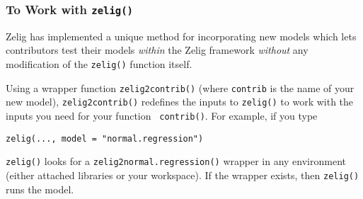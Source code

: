 \subsubsection{To Work with {\tt zelig()}}

Zelig has implemented a unique method for incorporating new models
which lets contributors test their models \emph{within} the Zelig
framework \emph{without} any modification of the {\tt zelig()}
function itself.  

Using a wrapper function {\tt zelig2contrib()} (where {\tt contrib} is
the name of your new model), {\tt zelig2contrib()} redefines the inputs to
{\tt zelig()} to work with the inputs you need for your function {\tt
contrib()}.  For example, if you type
\begin{verbatim}
zelig(..., model = "normal.regression")
\end{verbatim}
{\tt zelig()} looks for a {\tt zelig2normal.regression()} wrapper in any
environment (either attached libraries or your workspace).  If the
wrapper exists, then {\tt zelig()} runs the model.  

